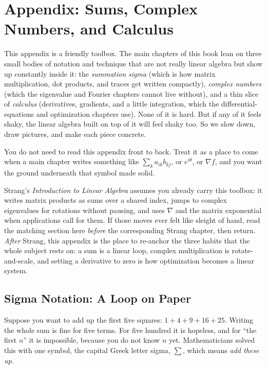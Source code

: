 \chapter{Appendix: Sums, Complex Numbers, and Calculus}

This appendix is a friendly toolbox. The main chapters of this book lean on three small bodies of
notation and technique that are not really linear algebra but show up constantly inside it: the
\emph{summation sigma} (which is how matrix multiplication, dot products, and traces get written
compactly), \emph{complex numbers} (which the eigenvalue and Fourier chapters cannot live without),
and a thin slice of \emph{calculus} (derivatives, gradients, and a little integration, which the
differential-equations and optimization chapters use). None of it is hard. But if any of it feels
shaky, the linear algebra built on top of it will feel shaky too. So we slow down, draw pictures,
and make each piece concrete.

You do not need to read this appendix front to back. Treat it as a place to come when a main chapter
writes something like $\sum_{k} a_{ik} b_{kj}$, or $e^{i\theta}$, or $\nabla f$, and you want the
ground underneath that symbol made solid.

\begin{strangbox}
Strang's \emph{Introduction to Linear Algebra} assumes you already carry this toolbox: it writes
matrix products as sums over a shared index, jumps to complex eigenvalues for rotations without
pausing, and uses $\nabla$ and the matrix exponential when applications call for them. If those moves
ever felt like sleight of hand, read the matching section here \emph{before} the corresponding Strang
chapter, then return. \emph{After} Strang, this appendix is the place to re-anchor the three habits
that the whole subject rests on: a sum is a linear loop, complex multiplication is rotate-and-scale,
and setting a derivative to zero is how optimization becomes a linear system.
\end{strangbox}

\section{Sigma Notation: A Loop on Paper}
\label{ch39:sigma}

Suppose you want to add up the first five squares: $1 + 4 + 9 + 16 + 25$. Writing the whole sum is
fine for five terms. For five hundred it is hopeless, and for ``the first $n$'' it is impossible,
because you do not know $n$ yet. Mathematicians solved this with one symbol, the capital Greek
letter sigma, $\sum$, which means \emph{add these up}.

